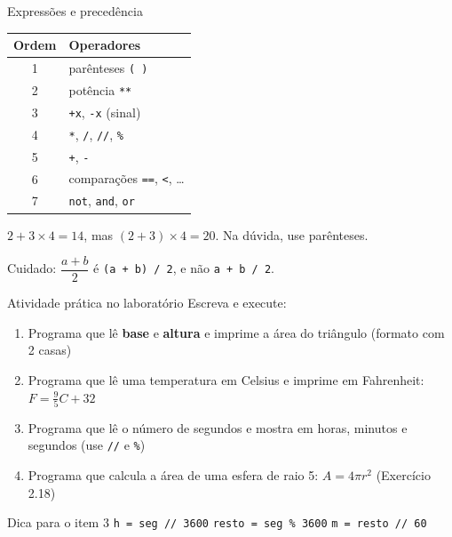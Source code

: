 \documentclass[aspectratio=169,10pt,t]{beamer}
\begin{document}
\begin{frame}{Expressões e precedência}
  \centering\small
  \begin{tabular}{cl}
    \toprule
    Ordem & Operadores\\
    \midrule
    1 & parênteses \texttt{( )}\\
    2 & potência \texttt{**}\\
    3 & \texttt{+x}, \texttt{-x} (sinal)\\
    4 & \texttt{*}, \texttt{/}, \texttt{//}, \texttt{\%}\\
    5 & \texttt{+}, \texttt{-}\\
    6 & comparações \texttt{==}, \texttt{<}, \ldots\\
    7 & \texttt{not}, \texttt{and}, \texttt{or}\\
    \bottomrule
  \end{tabular}

  \vspace{1.5ex}\normalsize
  \(2 + 3 \times 4 = 14\), mas \((2+3)\times4 = 20\). Na dúvida, \alert{use parênteses}.
  \vspace{1ex}

  \footnotesize Cuidado: \(\dfrac{a+b}{2}\) é \texttt{(a + b) / 2}, e não \texttt{a + b / 2}.
\end{frame}

\begin{frame}[fragile]{Atividade prática no laboratório}
  Escreva e execute:
  \begin{enumerate}
    \item Programa que lê \textbf{base} e \textbf{altura} e imprime a área do triângulo (formato com 2 casas)
    \item Programa que lê uma temperatura em Celsius e imprime em Fahrenheit: \(F = \tfrac{9}{5}C + 32\)
    \item Programa que lê o número de segundos e mostra em horas, minutos e segundos (use \texttt{//} e \texttt{\%})
    \item Programa que calcula a área de uma esfera de raio 5: \(A=4\pi r^2\) \hfill {\footnotesize (Exercício 2.18)}
  \end{enumerate}
  \begin{exampleblock}{Dica para o item 3}
    \texttt{h = seg // 3600} \hspace{1em} \texttt{resto = seg \% 3600} \hspace{1em} \texttt{m = resto // 60}
  \end{exampleblock}
\end{frame}
\end{document}
